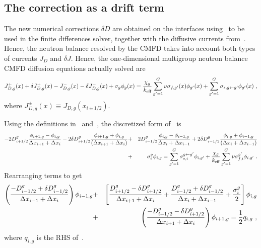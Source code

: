 %
\subsection{The correction as a drift term}
\label{sec:corr-drift}

The new numerical corrections $\delta D$ are obtained on the interfaces using~ to be used in the finite differences solver, together with the diffusive currents from~. Hence, the neutron balance resolved by the CMFD takes into account both types of currents $J_D$ and $\delta J$. %
Hence, the one-dimensional multigroup neutron balance CMFD diffusion equations actually solved are
\begin{equation}\label{eq:diff1}
J_{D,g}^+(x) + \delta J_{D,g}^+(x) -  J_{D,g}^-(x) - \delta J_{D,g}^-(x) + \sigma_{g}\phi_g(x) =  \frac{\chi_g}{{k_{\textrm{\scriptsize{eff}}}}}\sum\limits_{g'=1}^G\nu\sigma_{f,g'}(x)\phi_{g'}(x) + \sum\limits_{g'=1}^G\sigma_{s,g\leftarrow g'}\phi_{g'}(x) \,\, ,
\end{equation}
where $J_{D,g}^\pm (x)\equiv J_{D,g}(x_{i\pm 1/2})$.

Using the definitions in~ and~, the discretized form of~ is
\begin{eqnarray}\label{eq:FD_diff_full}
- 2D_{i+1/2}^g\frac{\phi_{i+1,g}-\phi_{i,g}}{\Delta x_{i+1} + \Delta x_i}
- 2\delta D_{i+1/2}^g\frac{\phi_{i+1,g}+\phi_{i,g}}{(\Delta x_{i+1}+\Delta x_i)}
&+& 2D_{i-1/2}^g\frac{\phi_{i,g}-\phi_{i-1,g}}{\Delta x_{i} + \Delta x_{i-1}}  
+ 2\delta D_{i-1/2}^g\frac{\phi_{i,g}+\phi_{i-1,g}}{(\Delta x_i+\Delta x_{i-1})} 
\nonumber \\
&+& \sigma_{i}^g \phi_{i,g} 
= \sum\limits_{g'=1}^G \sigma_{s,i}^{g\leftarrow g'}\phi_{i,g'}
+ \frac{\chi_g}{{k_{\textrm{\scriptsize{eff}}}}}\sum\limits_{g'=1}^G
 \nu\sigma_{f,i}^{g'}\phi_{i,g'} 
\,\,.
\end{eqnarray}
Rearranging terms to get
\begin{eqnarray}\label{eq:FD_diff_org}
\left(
\frac{-D_{i-1/2}^g + \delta D_{i-1/2}^g }{\Delta x_{i-1}+\Delta x_{i}}
\right)
\phi_{i-1,g}
&+&\left[
\frac{D_{i+1/2}^g - \delta D_{i+1/2}^g}{\Delta x_{i+1}+\Delta x_i}
+\frac{D_{i-1/2}^g + \delta D_{i-1/2}^g}{\Delta x_{i}+\Delta x_{i-1}}
+\frac{\sigma_{i}^g}{2}
\right]
\phi_{i,g}
\nonumber \\
&+&\left(
\frac{-D_{i+1/2}^g -\delta D_{i+1/2}^g }{\Delta x_{i+1}+\Delta x_{i}}
\right)
\phi_{i+1,g} =
\frac{1}{2}q_{i,g}\,\, ,
\end{eqnarray}
where $q_{i,g}$ is the RHS of~.

